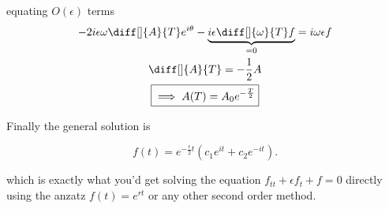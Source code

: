 equating $O (\epsilon )$ terms
\begin{gather*}
  -2i \epsilon \omega \diff[]{A}{T}e^{i \theta } - \underbrace{i \epsilon
  \diff[]{\omega }{T}f}_{=0} = i \omega \epsilon f \\
  \diff[]{A}{T} = -\frac{1}{2}A \\
  \boxed{\implies A(T) = A_0e^{-\frac{T}{2}}}
\end{gather*}

Finally the general solution is

\[
  \boxed{f(t) = e^{-\frac{\epsilon}{2}t} \left(c_1e^{it} + c_2e^{-it}\right)}
.\] 

which is exactly what you'd get solving the equation $f_{tt}+\epsilon f_{t}+f
=0$ directly using the anzatz $f(t) = e^{rt}$ or any other second order method.
